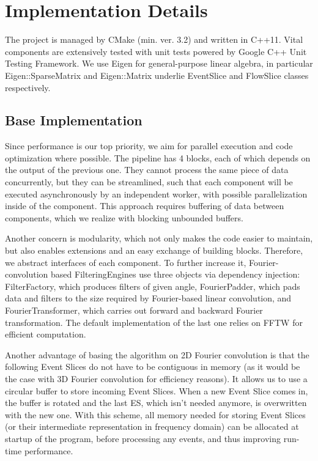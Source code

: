 \section{Implementation Details}
The project is managed by CMake (min. ver. 3.2) and written in C++11. 
Vital components are extensively tested with unit tests powered by Google C++ Unit Testing Framework. 
We use Eigen for general-purpose linear algebra, in particular Eigen::SparseMatrix and Eigen::Matrix underlie EventSlice and FlowSlice classes respectively.

\subsection{Base Implementation}

Since performance is our top priority, we aim for parallel execution and code optimization where possible. 
The pipeline has 4 blocks, each of which depends on the output of the previous one. 
They cannot process the same piece of data concurrently, but they can be streamlined, such that each component will be executed asynchronously by an independent worker, with possible parallelization inside of the component.
This approach requires buffering of data between components, which we realize with blocking unbounded buffers. 

Another concern is modularity, which not only makes the code easier to maintain, but also enables extensions and an easy exchange of building blocks. 
Therefore, we abstract interfaces of each component.
To further increase it, Fourier-convolution based FilteringEngines use three objects via dependency injection: FilterFactory, which produces filters of given angle, FourierPadder, which pads data and filters to the size required by Fourier-based linear convolution, and FourierTransformer, which carries out forward and backward Fourier transformation. The default implementation of the last one relies on FFTW for efficient computation.

Another advantage of basing the algorithm on 2D Fourier convolution is that the following Event Slices do not have to be contiguous in memory (as it would be the case with 3D Fourier convolution for efficiency reasons).
It allows us to use a circular buffer to store incoming Event Slices.
When a new Event Slice comes in, the buffer is rotated and the last ES, which isn't needed anymore, is overwritten with the new one.
With this scheme, all memory needed for storing Event Slices (or their intermediate representation in frequency domain) can be allocated at startup of the program, before processing any events, and thus improving run-time performance.

